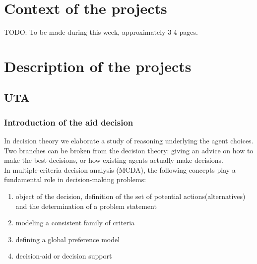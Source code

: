 \documentclass{report}
\begin{document}
\chapter{Context of the projects}
TODO: To be made during this week, approximately 3-4 pages.

\chapter{Description of the projects}

\section{UTA}
\subsection{Introduction of the aid decision}
In decision theory we elaborate a study of reasoning underlying the agent choices. Two branches can be broken from the decision theory: giving an advice on how to make the best decisions, or how existing agents actually make decisions. \\
In multiple-criteria decision analysis (MCDA), the following concepts play a fundamental role in decision-making problems: 
\begin{enumerate}
\item object of the decision, definition of the set of potential actions(alternatives) and the determination of a problem statement
\item modeling a consistent family of criteria
\item defining a global preference model
\item decision-aid or decision support
\end{enumerate}
\end{document}
